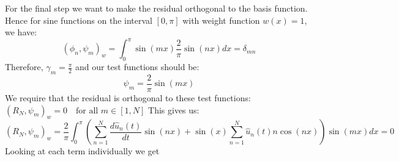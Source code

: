 For the final step we want to make the residual orthogonal to the basis function. Hence for sine functions on the interval $[0,\pi]$ with weight function $w(x)=1$, we have:
\begin{equation}
	(\phi_n, \psi_m)_w = \int_0^{\pi} \sin(mx) \frac{2}{\pi}\sin(nx) dx = \delta_{mn}
	\label{eq:weight_f}
\end{equation}
Therefore, $\gamma_m = \frac{\pi}{2}$ and our test functions should be:
\begin{equation}
	\psi_m = \frac{2}{\pi}\sin(mx)
	\label{eq:test2}
\end{equation}
We require that the residual is orthogonal to these test functions:
$(R_N, \psi_m)_w = 0 \quad \text{for all } m \in[1, N]$
This gives us:
\begin{equation}
	\left(R_N, \psi_m\right)_w  = \frac{2}{\pi} \int_0^{\pi} \left ( \sum_{n=1}^{N} \frac{d\hat{u}_n(t)}{dt} \sin(nx) + \sin(x)  \sum_{n=1}^{N} \hat{u}_n(t) n \cos(nx) \right) \sin(mx) dx = 0
	\label{eq:res_der}
\end{equation}
Looking at each term individually we get
